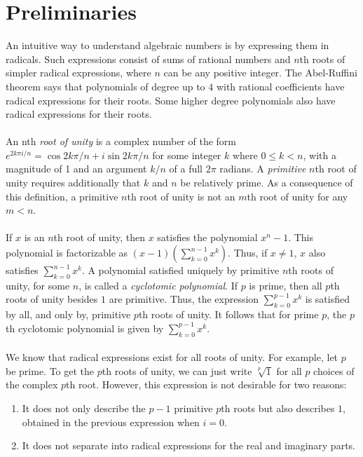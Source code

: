 \documentclass{article}
\begin{document}
\section{Preliminaries}
    An intuitive way to understand algebraic numbers is by expressing them in radicals. Such expressions consist of sums of rational numbers and $ n $th roots of simpler radical expressions, where $ n $ can be any positive integer. The Abel-Ruffini theorem says that polynomials of degree up to $ 4 $ with rational coefficients have radical expressions for their roots. Some higher degree polynomials also have radical expressions for their roots.\\
    \\
    An nth \textit{root of unity} is a complex number of the form $ e^{2k \pi i/n} = \cos{2k \pi/n} + i \sin{2k \pi/n} $ for some integer $ k $ where $ 0 \le k < n $, with a magnitude of 1 and an argument $ k/n $ of a full $ 2 \pi $ radians. A \textit{primitive} $ n $th root of unity requires additionally that $ k $ and $ n $ be relatively prime. As a consequence of this definition, a primitive $ n $th root of unity is not an $ m $th root of unity for any $ m < n $.\\
    \\
    If $ x $ is an $ n $th root of unity, then $ x $ satisfies the polynomial $ x^n - 1 $. This polynomial is factorizable as $ (x - 1)(\sum_{k = 0}^{n - 1} x^k) $. Thus, if $ x \ne 1 $, $ x $ also satisfies $ \sum_{k = 0}^{n - 1} x^k $. A polynomial satisfied uniquely by primitive $ n $th roots of unity, for some $ n $, is called a \textit{cyclotomic polynomial}. If $ p $ is prime, then all $ p $th roots of unity besides $ 1 $ are primitive. Thus, the expression $ \sum_{k = 0}^{p - 1} x^k $ is satisfied by all, and only by, primitive $ p $th roots of unity. It follows that for prime $ p $, the $ p $th cyclotomic polynomial is given by $ \sum_{k = 0}^{p - 1} x^k $.\\
    \\
    We know that radical expressions exist for all roots of unity. For example, let $ p $ be prime. To get the $ p $th roots of unity, we can just write $ \sqrt[p]{1} $ for all $ p $ choices of the complex $ p $th root. However, this expression is not desirable for two reasons:
    \begin{enumerate}
        \item It does not only describe the $ p - 1 $ primitive $ p $th roots but also describes $ 1 $, obtained in the previous expression when $ i = 0 $.
        \item It does not separate into radical expressions for the real and imaginary parts.
    \end{enumerate}
\end{document}
